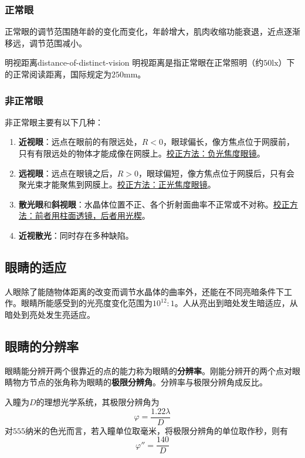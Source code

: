 \documentclass[cn,10pt,chinesefont=founder,math=newtx,cite=super,twoside]{elegantbook}
\begin{document}
\subsubsection{正常眼}
正常眼的调节范围随年龄的变化而变化，年龄增大，肌肉收缩功能衰退，近点逐渐移远，调节范围减小。

\begin{definition}{明视距离}{distance-of-distinct-vision}
	明视距离是指正常眼在正常照明（约$50\mathrm{lx}$）下的正常阅读距离，国际规定为$250\mathrm{mm}$。
\end{definition}


\subsubsection{非正常眼}
非正常眼主要有以下几种：
\begin{enumerate}
	\item \textbf{近视眼}：远点在眼前的有限远处，$R<0$，眼球偏长，像方焦点位于网膜前，只有有限远处的物体才能成像在网膜上。\uline{校正方法：负光焦度眼镜}。
	\item \textbf{远视眼}：远点在眼镜之后，$R>0$，眼球偏短，像方焦点位于网膜后，只有会聚光束才能聚焦到网膜上。\uline{校正方法：正光焦度眼镜}。
	\item \textbf{散光眼}和\textbf{斜视眼}：水晶体位置不正、各个折射面曲率不正常或不对称。\uline{校正方法：前者用柱面透镜，后者用光楔}。
	\item \textbf{近视散光}：同时存在多种缺陷。
\end{enumerate}

\subsection{眼睛的适应}
人眼除了能随物体距离的改变而调节水晶体的曲率外，还能在不同亮暗条件下工作。眼睛所能感受到的光亮度变化范围为$10^{12}:1$。人从亮出到暗处发生暗适应，从暗处到亮处发生亮适应。

\subsection{眼睛的分辨率}
眼睛能分辨开两个很靠近的点的能力称为眼睛的\textbf{分辨率}。刚能分辨开的两个点对眼睛物方节点的张角称为眼睛的\textbf{极限分辨角}。分辨率与极限分辨角成反比。

入瞳为$D$的理想光学系统，其极限分辨角为
\begin{equation}
\varphi=\frac{1.22\lambda}{D}
\label{eq:limiting-angle-of-resolution}
\end{equation}
对$555$纳米的色光而言，若入瞳单位取毫米，将极限分辨角的单位取作秒，则有
\begin{equation}
\varphi''=\frac{140}{D}
\end{equation}
\end{document}
